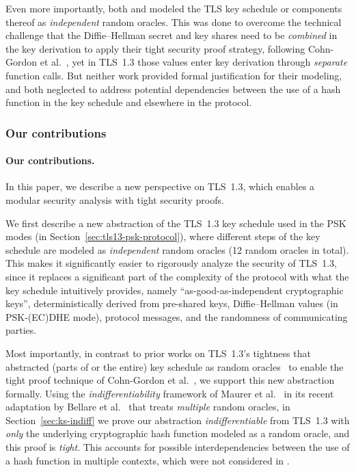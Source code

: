 Even more importantly, both \cite{ACNS:DavGun21} and \cite{JC:DieJag21} modeled the TLS key schedule or components thereof as \emph{independent} random oracles.
This was done to overcome the technical challenge that the Diffie--Hellman secret and key shares need to be \emph{combined} in the key derivation to apply their tight security proof strategy, following Cohn-Gordon et al.~\cite{C:CCGJJ19}, yet in TLS~1.3 those values enter key derivation through \emph{separate} function calls.
But neither work provided formal justification for their modeling, and both neglected to address potential dependencies between the use of a hash function in the key schedule and elsewhere in the protocol.


\iffull
\subsubsection*{Our contributions}
\else
\paragraph{Our contributions.}
\fi
In this paper, we describe a new perspective on TLS~1.3, which enables a modular security analysis with tight security proofs.

	
	We first describe a new abstraction of the TLS~1.3 key schedule used in the PSK modes (in Section~\ref{sec:tls13-psk-protocol}), where different steps of the key schedule are modeled as \emph{independent} random oracles (12 random oracles in total).
	This makes it significantly easier to rigorously analyze the security of TLS~1.3, since it replaces a significant part of the complexity of the protocol with what the key schedule intuitively provides,
	namely ``as-good-as-independent cryptographic keys'', deterministically derived from pre-shared keys, Diffie--Hellman values (in PSK-(EC)DHE mode), protocol messages, and the randomness of communicating parties.

	Most importantly, in contrast to prior works on TLS~1.3's tightness that abstracted (parts of or the entire) key schedule as random oracles~\cite{JC:DieJag21,ACNS:DavGun21} to enable the tight proof technique of Cohn-Gordon et al.~\cite{C:CCGJJ19}, we support this new abstraction formally.
	Using the \emph{indifferentiability} framework of Maurer et al.~\cite{TCC:MauRenHol04} in its recent adaptation by Bellare et al.~\cite{EC:BelDavGun20} that treats \emph{multiple} random oracles,
	in Section~\ref{sec:ks-indiff} we prove our abstraction \emph{indifferentiable} from TLS~1.3 with \emph{only} the underlying cryptographic hash function modeled as a random oracle,
	and this proof is \emph{tight}.
	This accounts for possible interdependencies between the use of a hash function in multiple contexts, which were not considered in \cite{JC:DieJag21,ACNS:DavGun21}.

